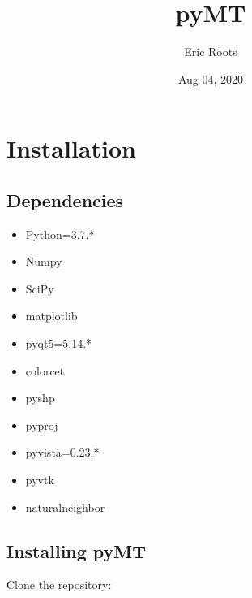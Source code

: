 \documentclass[letterpaper,10pt,english]{sphinxmanual}
\title{pyMT}
\date{Aug 04, 2020}
\author{Eric Roots}
\begin{document}
\pagestyle{empty}
\sphinxmaketitle
\pagestyle{plain}
\sphinxtableofcontents
\pagestyle{normal}
\label{\detokenize{index::doc}}



\chapter{Installation}
\label{\detokenize{content/api_core/installation:installation}}\label{\detokenize{content/api_core/installation::doc}}

\section{Dependencies}
\label{\detokenize{content/api_core/installation:dependencies}}\begin{itemize}
\item {} 
Python=3.7.*

\item {} 
Numpy

\item {} 
SciPy

\item {} 
matplotlib

\item {} 
pyqt5=5.14.*

\item {} 
colorcet

\item {} 
pyshp

\item {} 
pyproj

\item {} 
pyvista=0.23.*

\item {} 
pyvtk

\item {} 
naturalneighbor

\end{itemize}


\section{Installing pyMT}
\label{\detokenize{content/api_core/installation:installing-pymt}}
Clone the repository:

\begin{sphinxVerbatim}[commandchars=\\\{\}]
  
\end{sphinxVerbatim}
\end{document}
